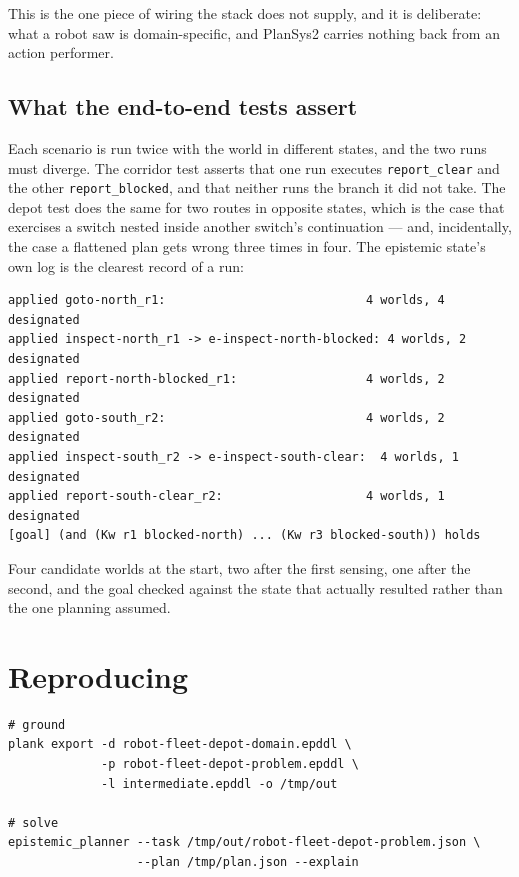 \documentclass[11pt,a4paper]{article}
\begin{document}
This is the one piece of wiring the stack does not supply, and it is deliberate:
what a robot saw is domain-specific, and PlanSys2 carries nothing back from an
action performer.

\subsection{What the end-to-end tests assert}

Each scenario is run twice with the world in different states, and the two runs
must diverge. The corridor test asserts that one run executes
\texttt{report\_clear} and the other \texttt{report\_blocked}, and that neither
runs the branch it did not take. The depot test does the same for two routes in
opposite states, which is the case that exercises a switch nested inside another
switch's continuation --- and, incidentally, the case a flattened plan gets
wrong three times in four. The epistemic state's own log is the clearest record
of a run:

\begin{lstlisting}
applied goto-north_r1:                            4 worlds, 4 designated
applied inspect-north_r1 -> e-inspect-north-blocked: 4 worlds, 2 designated
applied report-north-blocked_r1:                  4 worlds, 2 designated
applied goto-south_r2:                            4 worlds, 2 designated
applied inspect-south_r2 -> e-inspect-south-clear:  4 worlds, 1 designated
applied report-south-clear_r2:                    4 worlds, 1 designated
[goal] (and (Kw r1 blocked-north) ... (Kw r3 blocked-south)) holds
\end{lstlisting}

\noindent
Four candidate worlds at the start, two after the first sensing, one after the
second, and the goal checked against the state that actually resulted rather
than the one planning assumed.

\section{Reproducing}

\begin{lstlisting}
# ground
plank export -d robot-fleet-depot-domain.epddl \
             -p robot-fleet-depot-problem.epddl \
             -l intermediate.epddl -o /tmp/out

# solve
epistemic_planner --task /tmp/out/robot-fleet-depot-problem.json \
                  --plan /tmp/plan.json --explain
\end{lstlisting}
\end{document}
